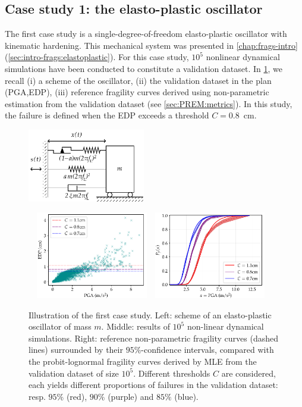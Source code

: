 \subsection{Case study 1: the elasto-plastic oscillator}


The first case study is a single-degree-of-freedom elasto-plastic oscillator
with kinematic hardening. This mechanical system was presented in   \cref{chap:frags-intro} (\cref{sec:intro-frags:elastoplastic}).
For this case study, $10^5$ nonlinear dynamical simulations have been conducted to constitute a validation dataset.
In \cref{fig:PREM:oscill}, we recall (i) a scheme of the oscillator, (ii) the validation dataset in the plan (PGA,EDP), (iii) reference fragility curves derived using non-parametric estimation from the validation dataset (see \cref{sec:PREM:metrics}).
In this study, the failure is defined when the EDP exceeds a threshold $C=0.8$~cm.

\begin{figure}[h]
    \centering
    \parbox[b][3.8cm][t]{5.2cm}{
        \includegraphics[height=3.2cm]{figures/intro-frags/KBEPO_rheo.pdf}}\ \ 
    \includegraphics[height=3.8cm]{figures/intro-frags/oscill/cloudPGA.pdf}\ \ 
    \includegraphics[height=3.8cm]{figures/intro-frags/oscill/refs_PGA.pdf}
    \caption{Illustration of the first case study. Left: scheme of an elasto-plastic oscillator of mass $m$. Middle: results of $10^5$ non-linear dynamical simulations. Right: reference non-parametric fragility curves (dashed lines) surrounded by their $95\%$-confidence intervals, compared with the probit-lognormal fragility curves derived by MLE from the validation dataset of size $10^5$. Different thresholds $C$ are considered, each yields different proportions of failures in the validation dataset: resp. $95\%$ (red), $90\%$ (purple) and $85\%$ (blue).}
    \label{fig:PREM:oscill}
\end{figure}



